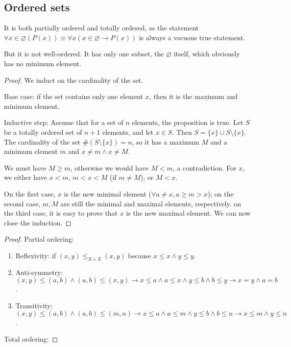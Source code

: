 \subsection{Ordered sets}
It is both partially ordered and totally ordered, as the statement $\forall x \in \varnothing(P(x)) \equiv \forall x(x \in \varnothing \to P(x))$ is always a vacuous true statement.

But it is not well-ordered. It has only one subset, the $\varnothing$ itself, which obviously has no minimum element.


\begin{proof}
	We induct on the cardinality of the set. 
	
	Base case: if the set contains only one element $x$, then it is the maximum and minimum element.
	
	Inductive step: Assume that for a set of $n$ elements, the proposition is true. Let $S$ be a totally ordered set of $n+1$ elements, and let $x \in S$. Then $S = \{x\} \cup S \setminus \{x\}$. The cardinality of the set $\# (S \setminus \{x\}) = n$, so it has a maximum $M$ and a minimum element $m$ and $x \ne m \wedge x \ne M$.
	
	We must have $M \geq m$, otherwise we would have $M < m$, a contradiction. For $x$, we either have $x < m$, $m < x < M$ (if $m \neq M$), or $M < x$.
	
	On the first case, $x$ is the new minimal element ($\forall a \ne x, a \geq m > x$); on the second case, $m,M$ are still the minimal and maximal elements, respectively. on the third case, it is easy to prove that $x$ is the new maximal element. We can now close the induction.
\end{proof}

\begin{proof}
	Partial ordering: 
	\begin{enumerate}
		\item Reflexivity: if $(x,y) \leq_{X \times X} (x,y)$ because $x \leq x \wedge y \leq y$.
		\item Anti-symmetry: $(x,y) \leq (a,b) \wedge (a,b) \leq (x,y) \to x \leq a \wedge a \leq x \wedge y \leq b \wedge b \leq y \to x = y \wedge a = b$.
		\item Transitivity: $(x,y) \leq (a,b) \wedge (a,b) \leq (m,n) \to x \leq a \wedge a \leq m \wedge y \leq b \wedge b \leq n \to x\leq m \wedge y \leq n$.
	\end{enumerate}
	Total ordering:
\end{proof}


